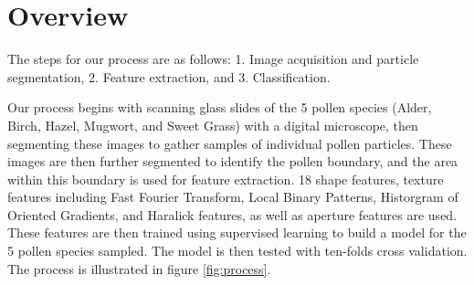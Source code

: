 \section{Overview} 

The steps for our process are as follows: 1. Image acquisition and particle segmentation, 2. Feature extraction, and 3. Classification.

Our process begins with scanning glass slides of the 5 pollen species (Alder, Birch, Hazel, Mugwort, and Sweet Grass) with a digital microscope, then segmenting these images to gather samples of individual pollen particles. These images are then further segmented to identify the pollen boundary, and the area within this boundary is used for feature extraction. 18 shape features, texture features including Fast Fourier Transform, Local Binary Patterns, Historgram of Oriented Gradients, and Haralick features, as well as aperture features are used. These features are then trained using supervised learning to build a model for the 5 pollen species sampled. The model is then tested with ten-folds cross validation. The process is illustrated in figure \ref{fig:process}. 
    
    
    
    
    
    
    
    
    
    
    
    
  
  
  
  
  
  
  
  
  
  
  
  
  